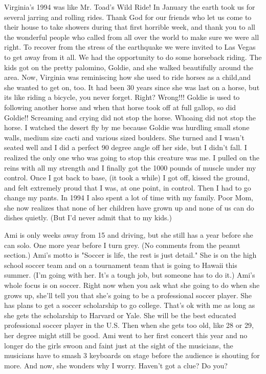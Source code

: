 Virginia's 1994 was like Mr. Toad's Wild Ride! In January the earth took us for several jarring and rolling rides. Thank God for our friends who
let us come to their house to take showers during that first horrible week, and thank you to all the wonderful people who called from all over
the world to make sure we were all right. To recover from the stress of the earthquake we were invited to Las Vegas to get away from it all. We
had the opportunity to do some horseback riding. The kids got on the pretty palomino, Goldie, and she walked beautifully around the area. Now,
Virginia was reminiscing how she used to ride horses as a child,and she wanted to get on, too. It had been 30 years since she was last on a
horse, but its like riding a bicycle, you never forget. Right? Wrong!!! Goldie is used to following another horse and when that horse took off
at full gallop, so did Goldie!! Screaming and crying did not stop the horse. Whoaing did not stop the horse. I watched the desert fly by me
because Goldie was hurdling small stone walls, medium size cacti and various sized boulders. She turned and I wasn't seated well and I did a
perfect 90 degree angle off her side, but I didn't fall. I realized the only one who was going to stop this creature was me. I pulled on the
reins with all my strength and I finally got the 1000 pounds of muscle under my control. Once I got back to base, (it took a while) I got off,
kissed the ground, and felt extremely proud that I was, at one point, in control. Then I had to go change my pants. In 1994 I also spent a lot
of time with my family. Poor Mom, she now realizes that none of her children have grown up and none of us can do dishes quietly. (But I'd never
admit that to my kids.)

Ami is only weeks away from 15 and driving, but she still has a year before she can solo. One more year before I turn grey. (No comments from
the peanut section.) Ami's motto is "Soccer is life, the rest is just detail." She is on the high school soccer team and on a tournament team
that is going to Hawaii this summer. (I'm going with her. It's a tough job, but someone has to do it.) Ami's whole focus is on soccer. Right now
when you ask what she going to do when she grows up, she'll tell you that she's going to be a professional soccer player. She has plans to get a
soccer scholarship to go college. That's ok with me as long as she gets the scholarship to Harvard or Yale. She will be the best educated
professional soccer player in the U.S. Then when she gets too old, like 28 or 29, her degree might still be good. Ami went to her first concert
this year and no longer do the girls swoon and faint just at the sight of the musicians, the musicians have to smash 3 keyboards on stage before
the audience is shouting for more. And now, she wonders why I worry. Haven't got a clue? Do you?

